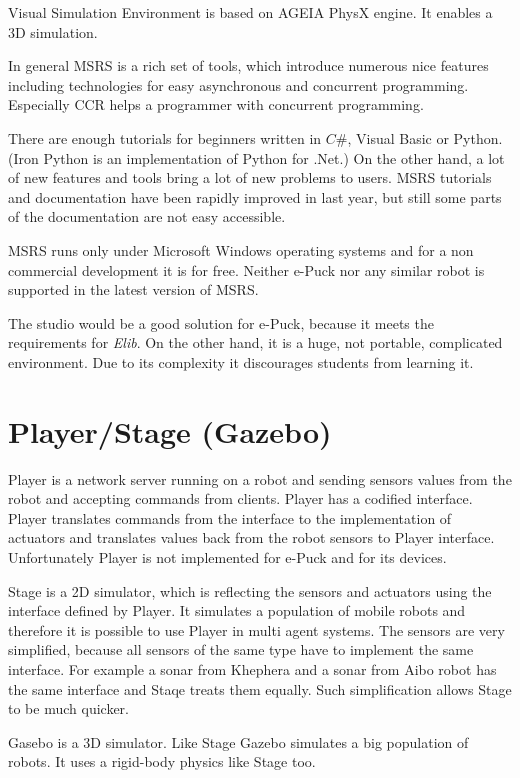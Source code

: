 	Visual Simulation Environment is based on AGEIA PhysX engine. It enables a 3D simulation.
	
	In general MSRS is a rich set of tools, which introduce numerous nice features including
	technologies for easy asynchronous and concurrent programming. Especially CCR helps
	a programmer with concurrent programming. 
	
	There are enough tutorials for beginners written
	in $C\#$, Visual Basic or Python. (Iron Python is an implementation of Python for .Net.)
	On the other hand, a lot of new features and tools bring a lot of new problems to users.
	MSRS tutorials and documentation have been rapidly improved in last year, but still some parts
	of the documentation are not easy accessible.
	
	MSRS runs only under Microsoft Windows operating systems and for a non commercial development
	it is for free. Neither e-Puck nor any similar robot is supported in the latest version of MSRS.
	
	The studio would be a good solution for e-Puck, because it meets the requirements for {\it Elib}.
	On the other hand, it is a huge, not portable, complicated environment.
	Due to its complexity it discourages students from learning it.
\section{Player/Stage (Gazebo) \cite{player}}
	Player is a network server running on a robot and sending sensors values from the robot and
	accepting commands from clients. Player has a codified interface. Player translates
	commands from the interface to the implementation of actuators and translates values back from the robot sensors 
	to Player interface. Unfortunately Player is not implemented for e-Puck
	and for its devices.
	
	Stage is a 2D simulator, which is reflecting the sensors and actuators using the interface defined by Player.
	It simulates a population of mobile robots and therefore it is possible to use Player 
	in multi agent systems.
	The sensors are very simplified, because all sensors of the same type 
	have to implement the same interface. For example a sonar from Khephera and a sonar from Aibo robot
	has the same interface and Staqe treats them equally. 
	Such simplification allows Stage to be much quicker.
	
	Gasebo is a 3D simulator. Like Stage Gazebo simulates a big population of robots.
	It uses a rigid-body physics like Stage too.
	
